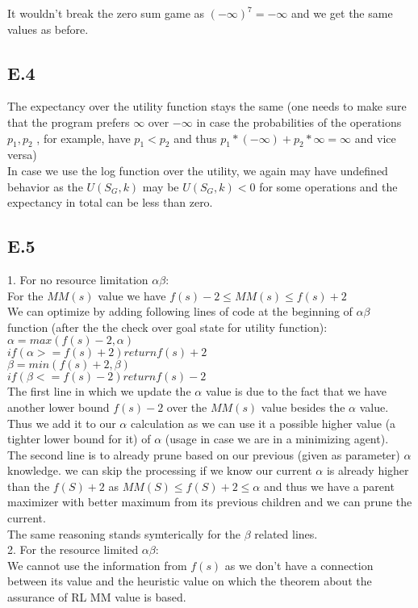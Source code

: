 \documentclass[12pt]{article}
\begin{document}
It wouldn't break the zero sum game as $(-\infty)^7 = -\infty$ and we get the same values as before.

\subsection*{E.4}

The expectancy over the utility function stays the same (one needs to make sure that the program prefers $\infty$ over $-\infty$ in case the probabilities of the operations $p_1,p_2$ , for example, have $p_1<p_2$ and thus $p_1*(-\infty) + p_2*\infty = \infty$ and vice versa)\\
In case we use the log function over the utility, we again may have undefined behavior as the $U(S_G,k)$ may be $U(S_G,k)<0$ for some operations and the expectancy in total can be less than zero.

\subsection*{E.5}

1. For no resource limitation $\alpha\beta$:\\
For the $MM(s)$ value we have $f(s)-2 \leq MM(s) \leq f(s)+2$\\
We can optimize by adding following lines of code at the beginning of $\alpha\beta$ function (after the the check over goal state for utility function):\\
$\alpha = max(f(s)-2,\alpha)$\\
$if (\alpha >= f(s)+2) return f(s)+2$\\
$\beta = min(f(s)+2,\beta)$\\
$if (\beta <= f(s)-2) return f(s)-2$\\

The first line in which we update the $\alpha$ value is due to the fact that we have another lower bound $f(s)-2$ over the $MM(s)$ value besides the $\alpha$ value.\\
Thus we add it to our $\alpha$ calculation as we can use it a possible higher value (a tighter lower bound for it) of $\alpha$ (usage in case we are in a minimizing agent).\\

The second line is to already prune based on our previous (given as parameter) $\alpha$ knowledge. we can skip the processing if we know our current $\alpha$ is already higher than the $f(S)+2$ as $MM(S) \leq f(S) + 2 \leq \alpha$  and thus we have a parent maximizer with better maximum from its previous children and we can prune the current.\\
The same reasoning stands symterically for the $\beta$ related lines.\\

2. For the resource limited $\alpha\beta$:\\
We cannot use the information from $f(s)$ as we don't have a connection between its value and the heuristic value on which the theorem about the assurance of RL MM value is based.
\end{document}
